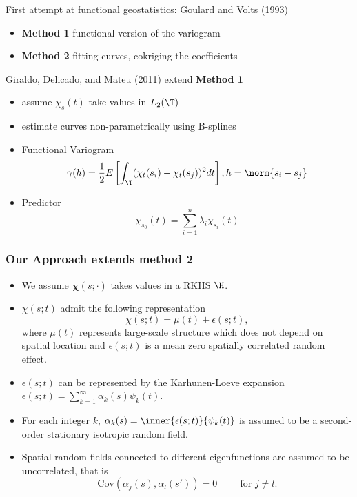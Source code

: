 \frame
{
First attempt at functional geostatistics: Goulard and Volts (1993)
\begin{itemize}
\item{\textbf{Method 1}} functional version of the variogram
\item{\textbf{Method 2}} fitting curves, cokriging the coefficients\\[0.2cm]
\end{itemize}
Giraldo, Delicado, and Mateu (2011) extend \textbf{Method 1}
\begin{itemize}
\item assume $\chi_s(t)$ take values in $L_2(\T)$
\item estimate curves non-parametrically using B-splines
\item Functional Variogram \[ \gamma(h) = \frac{1}{2}E\left[ \int_{\T}(\chi_t(s_i) - \chi_t(s_j))^2 dt \right] , h = \norm{s_i - s_j}\]
\item Predictor \[
\widehat{\chi_{s_0}(t)} = \sum_{i=1}^n \lambda_i \chi_{s_i}(t)
\]
\end{itemize}
}



\frame
{
\frametitle{Our Approach extends method 2}
\begin{itemize}
\item We assume $\boldsymbol\chi(s; \cdot)$  takes values in a RKHS $\H$. \\[0.2cm]
\item $\chi(s;t)$ admit the following representation 
\begin{equation}
 	\chi(s;t) = \mu(t) + \epsilon(s;t),
\end{equation}
where $\mu(t)$ represents large-scale structure which does not depend on spatial location and $\epsilon(s;t)$ is a mean zero spatially correlated random effect. 
 \item $\epsilon(s;t)$ can be represented by the Karhunen-Loeve expansion $\epsilon(s;t) = \sum_{k=1}^{\infty} \alpha_k(s)\psi_k(t)$. 
 \item For each integer $k$, $\alpha_k(s) = \inner{\epsilon(s;t)}{ \psi_k(t)}$ is assumed to be a second-order stationary isotropic random field. 
 \item Spatial random fields connected to different eigenfunctions are assumed to be uncorrelated, that is 
\begin{equation}
	\text{Cov}(\alpha_j(s), \alpha_l(s')) = 0 \hspace{1cm} \text{for } j \neq l.
	\label{eq:nocrosscor}
\end{equation} 
\end{itemize}
}

